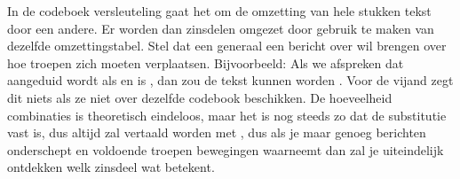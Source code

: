 In de codeboek versleuteling gaat het om de omzetting van hele stukken tekst door een andere. Er worden dan zinsdelen omgezet door gebruik te maken van dezelfde omzettingstabel. Stel dat een generaal een bericht over wil brengen over hoe troepen zich moeten verplaatsen. Bijvoorbeeld:  Als we afspreken dat  aangeduid wordt als  en  is , dan zou de tekst kunnen worden . Voor de vijand zegt dit niets als ze niet over dezelfde codebook beschikken. De hoeveelheid combinaties is theoretisch eindeloos, maar het is nog steeds zo dat de substitutie vast is, dus altijd zal  vertaald worden met , dus als je maar genoeg berichten onderschept en voldoende troepen bewegingen waarneemt dan zal je uiteindelijk ontdekken welk zinsdeel wat betekent.


